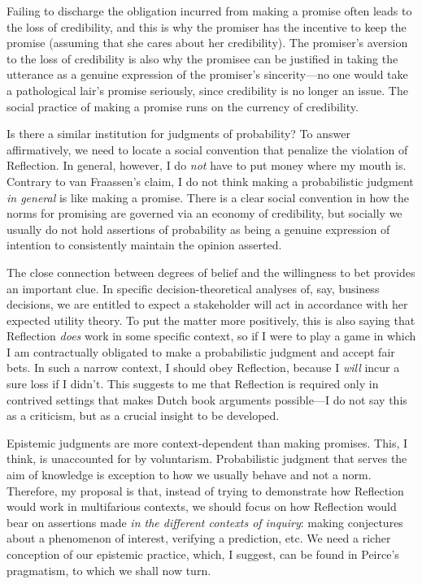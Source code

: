 Failing to discharge the obligation incurred from making a promise often
leads to the loss of credibility, and this is why the promiser has the
incentive to keep the promise (assuming that she cares about her
credibility). The promiser's aversion to the loss of credibility is also
why the promisee can be justified in taking the utterance as a genuine
expression of the promiser's sincerity---no one would take a
pathological lair's promise seriously, since credibility is no longer an
issue. The social practice of making a promise runs on the currency of
credibility.

Is there a similar institution for judgments of probability? To answer
affirmatively, we need to locate a social convention that penalize the
violation of Reflection. In general, however, I do \emph{not} have to
put money where my mouth is. Contrary to van Fraassen's claim, I do not
think making a probabilistic judgment \emph{in general} is like making a
promise. There is a clear social convention in how the norms for
promising are governed via an economy of credibility, but socially we
usually do not hold assertions of probability as being a genuine
expression of intention to consistently maintain the opinion asserted.

The close connection between degrees of belief and the willingness to
bet provides an important clue. In specific decision-theoretical analyses of, say, business decisions, we are entitled to expect a stakeholder will act in accordance with her expected utility theory.  To put the matter more positively, this is also saying that 
Reflection \emph{does} work in some specific context, so if I were to play a game in which I am contractually
obligated to make a probabilistic judgment and accept fair bets. In such
a narrow context, I should obey Reflection, because I \emph{will} incur
a sure loss if I didn't. This suggests to me that Reflection is required only in contrived
settings that makes Dutch book arguments possible---I do not say this as
a criticism, but as a crucial insight to be developed. 

Epistemic judgments are more context-dependent than making promises. This, I think, is unaccounted for by voluntarism. Probabilistic judgment that serves the aim of knowledge is exception to how we usually behave and not a norm. Therefore, my proposal is that, instead of trying to demonstrate how Reflection would work in multifarious contexts, we should focus on how Reflection would bear on assertions made \emph{in the different contexts of inquiry}: making conjectures about a phenomenon of interest, verifying a prediction, etc. We need a richer conception of our epistemic practice, which, I suggest, can be found in Peirce's pragmatism, to which we shall now turn.

